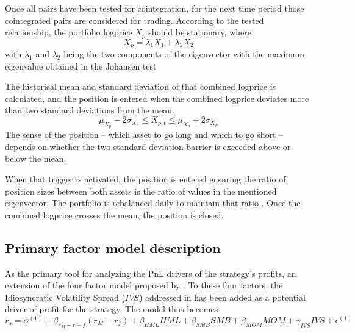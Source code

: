 Once all pairs have been tested for cointegration, for the next time period those cointegrated pairs are considered for trading. According to the tested relationship, the portfolio logprice $X_p$ should be stationary, where
\begin{equation}
    X_p = \lambda_1 X_1 + \lambda_2 X_2
\end{equation}
with $\lambda_1$ and $\lambda_2$ being the two components of the eigenvector with the maximum eigenvalue obtained in the Johansen test

The historical mean and standard deviation of that combined logprice is calculated, and the position is entered when the combined logprice deviates more than two standard deviations from the mean. 
\begin{equation}
    \mu_{X_p} - 2\sigma_{X_p} \leq X_{p,t} \leq \mu_{X_p} + 2\sigma_{X_p}
\end{equation}
The sense of the position -- which asset to go long and which to go short -- depends on whether the two standard deviation barrier is exceeded above or below the mean.

When that trigger is activated, the position is entered ensuring the ratio of position sizes between both assets is the ratio of values in the mentioned eigenvector. The portfolio is rebalanced daily to maintain that ratio \cite{chan_2013}.
Once the combined logprice crosses the mean, the position is closed. 

\subsection{Primary factor model description}
As the primary tool for analyzing the PnL drivers of the strategy's profits, an extension of the four factor model proposed by \cite{carhart_1997}. To these four factors, the Idiosyncratic Volatility Spread ($IVS$) addressed in \cite{ioannis_2024} has been added as a potential driver of profit for the strategy. The model thus becomes
\begin{equation}
    \label{e:primary-regression}
    r_s = \alpha^{(1)} + \beta_{r_M-r-f}(r_M-r_f) + \beta_{HML}HML + \beta_{SMB}SMB + \beta_{MOM}MOM+ \gamma_{IVS}IVS + \epsilon^{(1)}
\end{equation}

